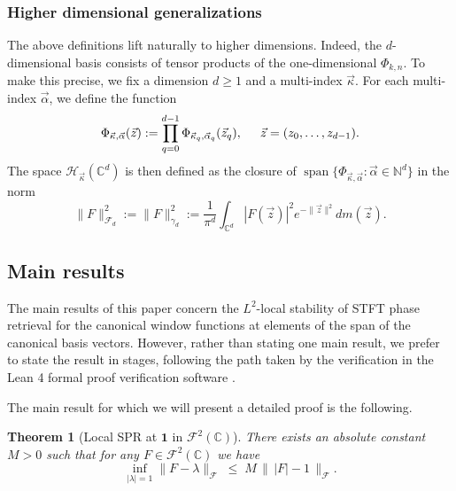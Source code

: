 \documentclass[11pt]{amsart}
\newtheorem{theorem}{Theorem}[section]
\theoremstyle{remark}
\newcommand{\N}{\mathbb{N}}
\begin{document}
\subsubsection{Higher dimensional generalizations} The above definitions lift naturally to higher dimensions. Indeed, the $d$-dimensional basis consists of tensor products of the one-dimensional $\Phi_{k,n}$. To make this precise, we fix a dimension $d\geq 1$ and a multi-index $\vec \kappa$. For each multi-index $\vec \alpha$, we define the function
\[
\Phi_{\vec\kappa,\vec\alpha}(\vec z)
:=\prod_{q=0}^{d-1}\Phi_{\vec\kappa_q,\vec\alpha_q}(\vec z_q), \hspace{5mm} \vec z=(z_0,\dots,z_{d-1}).
\]
The space $\mathcal{H}_{\vec\kappa}(\mathbb{C}^d)$ is then defined as the closure of  $\operatorname{span}\{\Phi_{\vec\kappa, \vec\alpha} :\vec \alpha \in \N^d\}$ in the norm
\begin{equation*}
  \|F\|_{\mathcal{F}_d}^2:= \|F\|_{\gamma_d}^2:=\frac{1}{\pi^d}\int_{\mathbb{C}^d}|F(\vec z)|^2  e^{-\lVert \vec z\rVert^2}dm(\vec z).
\end{equation*}

\subsection{Main results}
The main results of this paper concern the $L^2$-local stability of STFT phase retrieval for the canonical window functions at elements of the span of the canonical basis vectors. However, rather than stating one main result, we prefer to state the result in stages, following the path taken by the verification in the Lean 4 formal proof verification software \cite{lean4}. 
 \vspace{0.5em}

The main result for which we will present a detailed proof is the following.
\begin{theorem}[Local SPR at $\mathbf{1}$ in $\mathcal{F}^2(\mathbb{C})$]\label{main:local}
There exists an absolute constant $M> 0$ such
that for any $F\in \mathcal{F}^2(\mathbb{C})$ we have
\[
\inf_{|\lambda|=1}\lVert F - \lambda \rVert_{\mathcal{F}}
\;\le\;
M\,
\bigl\|\, \lvert F \rvert - 1 \,\bigr\|_{\mathcal{F}}.
\]
\end{theorem}
\end{document}
